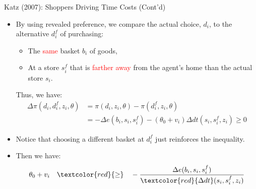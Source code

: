 \documentclass[aspectratio=169]{beamer}  %
\begin{document}
\begin{frame}{Katz (2007): Shoppers Driving Time Costs (Cont'd)}
    \begin{itemize}
    \item By using revealed preference, we compare the actual choice, $d_i$, to the alternative $d_{i}^{f}$ of purchasing:

        \begin{itemize}
            \item The \textcolor{red}{same} basket $b_i$ of goods,
            \item At a store $s_i^{f}$ that is \textcolor{red}{farther away} from the agent's home than the actual store $s_i$.
        \end{itemize}
    Thus, we have:
    \begin{align*}
        \Delta \pi(d_i, d_i^f, z_i, \theta) &= \pi(d_i, z_i, \theta) - \pi(d_{i}^{f}, z_i, \theta) \\
        &= - \Delta e(b_i, s_i, s_i^f) - (\theta_0 + v_i) \Delta dt(s_i, s_i^f, z_i) \geq 0
    \end{align*}
    \item Notice that choosing a different basket at $d_{i}^{f}$ just reinforces the inequality.
    \item Then we have:
    \begin{align*}
        \theta_0 + v_i \quad \textcolor{red}{\geq} \quad - \frac{\Delta e(b_i, s_i, s_i^f)}{\textcolor{red}{\Delta dt}(s_i, s_i^f, z_i)}
    \end{align*}
    \end{itemize}

\end{frame}
\end{document}

